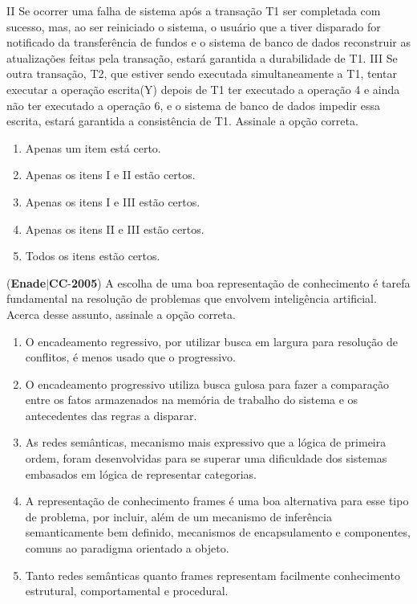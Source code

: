 \documentclass{exam}
\begin{document}
\begin{questions}
II Se ocorrer uma falha de sistema após a transação T1 ser
completada com sucesso, mas, ao ser reiniciado o sistema, o
usuário que a tiver disparado for notificado da transferência
de fundos e o sistema de banco de dados reconstruir as
atualizações feitas pela transação, estará garantida a
durabilidade de T1.
III Se outra transação, T2, que estiver sendo executada
simultaneamente a T1, tentar executar a operação
escrita(Y) depois de T1 ter executado a operação 4 e
ainda não ter executado a operação 6, e o sistema de banco
de dados impedir essa escrita, estará garantida a consistência
de T1.
Assinale a opção correta.
	\begin{enumerate}[label=\alph*)]
		\item  Apenas um item está certo.
		\item  Apenas os itens I e II estão certos.
		\item  Apenas os itens I e III estão certos.
		\item  Apenas os itens II e III estão certos.
		\item  Todos os itens estão certos.

	\end{enumerate}

\question (\textbf{Enade}$|$\textbf{CC}-\textbf{2005}) A escolha de uma boa representação de conhecimento é tarefa
fundamental na resolução de problemas que envolvem
inteligência artificial. Acerca desse assunto, assinale a opção
correta.
	\begin{enumerate}[label=\alph*)]
		\item  O encadeamento regressivo, por utilizar busca em largura
para resolução de conflitos, é menos usado que o progressivo.
		\item  O encadeamento progressivo utiliza busca gulosa para fazer
a comparação entre os fatos armazenados na memória de
trabalho do sistema e os antecedentes das regras a disparar.
		\item  As redes semânticas, mecanismo mais expressivo que a
lógica de primeira ordem, foram desenvolvidas para se
superar uma dificuldade dos sistemas embasados em lógica
de representar categorias.
		\item  A representação de conhecimento frames é uma boa
alternativa para esse tipo de problema, por incluir, além de
um mecanismo de inferência semanticamente bem definido,
mecanismos de encapsulamento e componentes, comuns ao
paradigma orientado a objeto.
		\item  Tanto redes semânticas quanto frames representam
facilmente conhecimento estrutural, comportamental e
procedural.


\end{enumerate}
\end{questions}
\end{document}
